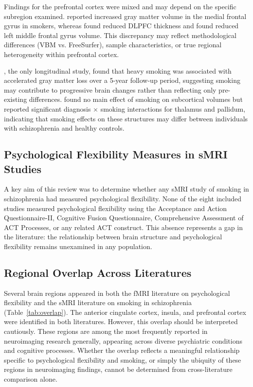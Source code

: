 \documentclass[12pt]{article}
\begin{document}
Findings for the prefrontal cortex were mixed and may depend on the specific subregion examined. \citet{tregellas2007} reported increased gray matter volume in the medial frontal gyrus in smokers, whereas \citet{schneider2014} found reduced DLPFC thickness and \citet{yokoyama2018} found reduced left middle frontal gyrus volume. This discrepancy may reflect methodological differences (VBM vs. FreeSurfer), sample characteristics, or true regional heterogeneity within prefrontal cortex.

\citet{vanharen2010}, the only longitudinal study, found that heavy smoking was associated with accelerated gray matter loss over a 5-year follow-up period, suggesting smoking may contribute to progressive brain changes rather than reflecting only pre-existing differences. \citet{ringin2022} found no main effect of smoking on subcortical volumes but reported significant diagnosis $\times$ smoking interactions for thalamus and pallidum, indicating that smoking effects on these structures may differ between individuals with schizophrenia and healthy controls.

\subsection{Psychological Flexibility Measures in sMRI Studies}

A key aim of this review was to determine whether any sMRI study of smoking in schizophrenia had measured psychological flexibility. None of the eight included studies measured psychological flexibility using the Acceptance and Action Questionnaire-II, Cognitive Fusion Questionnaire, Comprehensive Assessment of ACT Processes, or any related ACT construct. This absence represents a gap in the literature: the relationship between brain structure and psychological flexibility remains unexamined in any population.

\subsection{Regional Overlap Across Literatures}

Several brain regions appeared in both the fMRI literature on psychological flexibility and the sMRI literature on smoking in schizophrenia (Table~\ref{tab:overlap}). The anterior cingulate cortex, insula, and prefrontal cortex were identified in both literatures. However, this overlap should be interpreted cautiously. These regions are among the most frequently reported in neuroimaging research generally, appearing across diverse psychiatric conditions and cognitive processes. Whether the overlap reflects a meaningful relationship specific to psychological flexibility and smoking, or simply the ubiquity of these regions in neuroimaging findings, cannot be determined from cross-literature comparison alone.
\end{document}
